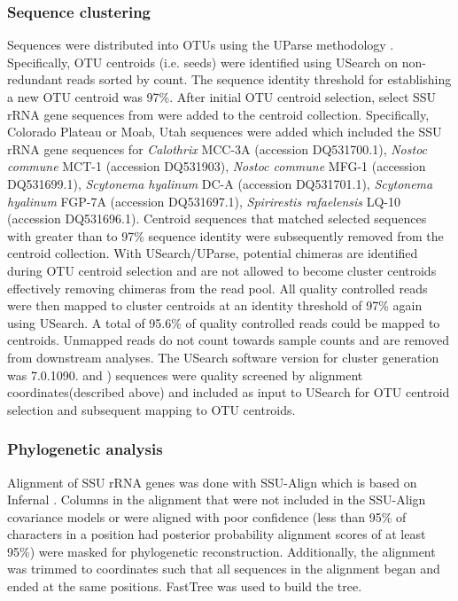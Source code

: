 \subsubsection{Sequence clustering}
Sequences were distributed into OTUs using the UParse methodology
\citep{23955772}. Specifically, OTU centroids (i.e. seeds) were identified
using USearch on non-redundant reads sorted by count. The sequence
identity threshold for establishing a new OTU centroid was 97\%. After initial
OTU centroid selection, select SSU rRNA gene sequences from \citet{Yeager}
were added to the centroid collection. Specifically, \citet{Yeager} Colorado
Plateau or Moab, Utah sequences were added which included the SSU rRNA gene
sequences for \textit{Calothrix} MCC-3A (accession DQ531700.1), \textit{Nostoc
commune} MCT-1 (accession DQ531903), \textit{Nostoc commune} MFG-1 (accession
DQ531699.1), \textit{Scytonema hyalinum} DC-A (accession DQ531701.1),
\textit{Scytonema hyalinum} FGP-7A (accession DQ531697.1), \textit{Spirirestis
rafaelensis} LQ-10 (accession DQ531696.1). Centroid sequences that matched
selected \citet{Yeager} sequences with greater than to 97\% sequence identity
were subsequently removed from the centroid collection. With USearch/UParse,
potential chimeras are identified during OTU centroid selection and are not
allowed to become cluster centroids effectively removing chimeras from the read
pool. All quality controlled reads were then mapped to cluster centroids at an
identity threshold of 97\% again using USearch. A total of 95.6\% of quality
controlled reads could be mapped to centroids. Unmapped reads do not count
towards sample counts and are removed from downstream analyses. The
USearch software version for cluster generation was 7.0.1090.
\citet{Garcia_Pichel_2013} and \citet{Steven_2013}) sequences were quality
screened by alignment coordinates(described above) and included as input to
USearch for OTU centroid selection and subsequent mapping to OTU centroids. 

\subsubsection{Phylogenetic analysis}
Alignment of SSU rRNA genes was done with SSU-Align which is based on Infernal
\citep{24008419, 19307242}. Columns in the alignment that were not included in
the SSU-Align covariance models or were aligned with poor confidence (less than
95\% of characters in a position had posterior probability alignment scores of
at least 95\%) were masked for phylogenetic reconstruction. Additionally, the
alignment was trimmed to coordinates such that all sequences in the alignment
began and ended at the same positions. FastTree \citep{20224823} was used to
build the tree.

